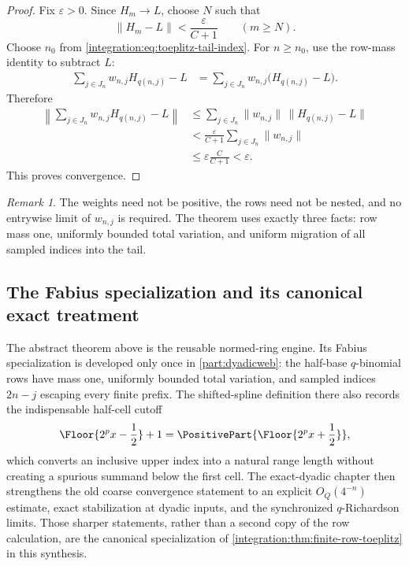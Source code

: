 \documentclass[11pt,oneside]{article}
\theoremstyle{definition}
\theoremstyle{remark}
\newtheorem{remark}[remark]{Remark}
\begin{document}
\begin{proof}
Fix $\varepsilon>0$.  Since $H_m\to L$, choose $N$ such that
\begin{equation}
 \|H_m-L\|<\frac{\varepsilon}{C+1}
 \qquad(m\ge N).
 \label{integration:eq:toeplitz-tail-error}
\end{equation}
Choose $n_0$ from \eqref{integration:eq:toeplitz-tail-index}.  For $n\ge n_0$, use the row-mass identity
to subtract $L$:
\begin{align*}
 \sum_{j\in J_n}w_{n,j}H_{q(n,j)}-L
 &=\sum_{j\in J_n}w_{n,j}\bigl(H_{q(n,j)}-L\bigr).
\end{align*}
Therefore
\begin{align*}
 \left\|\sum_{j\in J_n}w_{n,j}H_{q(n,j)}-L\right\|
 &\le\sum_{j\in J_n}\|w_{n,j}\|\,\|H_{q(n,j)}-L\|\\
 &<\frac{\varepsilon}{C+1}\sum_{j\in J_n}\|w_{n,j}\|\\
 &\le\varepsilon\frac{C}{C+1}<\varepsilon.
\end{align*}
This proves convergence.
\end{proof}

\begin{remark}
The weights need not be positive, the rows need not be nested, and no entrywise limit of
$w_{n,j}$ is required.  The theorem uses exactly three facts: row mass one, uniformly bounded
total variation, and uniform migration of all sampled indices into the tail.
\end{remark}

\subsection{The Fabius specialization and its canonical exact treatment}
\label{integration:sec:fabius-toeplitz}
The abstract theorem above is the reusable normed-ring engine.  Its Fabius specialization
is developed only once in \cref{part:dyadicweb}: the half-base \(q\)-binomial rows have
mass one, uniformly bounded total variation, and sampled indices \(2n-j\) escaping every
finite prefix.  The shifted-spline definition there also records the indispensable
half-cell cutoff
\[
 \Floor{2^p x-\frac12}+1
 =\PositivePart{\Floor{2^p x+\frac12}},
\]
which converts an inclusive upper index into a natural range length without creating a
spurious summand below the first cell.  The exact-dyadic chapter then strengthens the old
coarse convergence statement to an explicit \(O_Q(4^{-n})\) estimate, exact stabilization
at dyadic inputs, and the synchronized \(q\)-Richardson limits.  Those sharper statements,
rather than a second copy of the row calculation, are the canonical specialization of
\cref{integration:thm:finite-row-toeplitz} in this synthesis.
\end{document}
